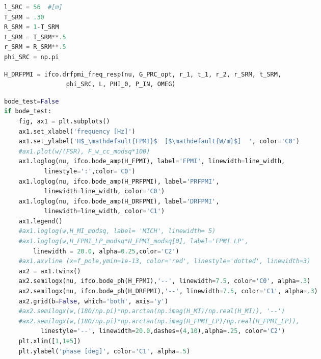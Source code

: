 \begin{spacing}{1.2}\begin{lstlisting}[frame=single, language=Python]
l_SRC = 56  #[m]
T_SRM = .30
R_SRM = 1-T_SRM
t_SRM = T_SRM**.5
r_SRM = R_SRM**.5
phi_SRC = np.pi
\end{lstlisting}\end{spacing}

\begin{spacing}{1.2}\begin{lstlisting}[frame=single, language=Python]
H_DRFPMI = ifco.drfpmi_freq_resp(nu, G_PRC_opt, r_1, t_1, r_2, r_SRM, t_SRM, 
				 phi_SRC, L, PHI_0, P_IN, OMEG)
\end{lstlisting}\end{spacing}

\begin{spacing}{1.2}\begin{lstlisting}[frame=single, language=Python]
bode_test=False
if bode_test:
    fig, ax1 = plt.subplots()
    ax1.set_xlabel('frequency [Hz]')
    ax1.set_ylabel('H$_\mathdefault{FPMI}$  [$\mathdefault{W/m}$]  ', color='C0')
    #ax1.plot(w/(FSR), F_w_cc_modsq*100)
    ax1.loglog(nu, ifco.bode_amp(H_FPMI), label='FPMI', linewidth=line_width, 
	       linestyle=':',color='C0')
    ax1.loglog(nu, ifco.bode_amp(H_PRFPMI), label='PRFPMI',  
	       linewidth=line_width, color='C0')
    ax1.loglog(nu, ifco.bode_amp(H_DRFPMI), label='DRFPMI',  
	       linewidth=line_width, color='C1')
    ax1.legend()
    #ax1.loglog(w,H_MI_modsq, label= 'MICH', linewidth= 5)
    #ax1.loglog(w,H_FPMI_LP_modsq*H_FPMI_modsq[0], label='FPMI LP', 
		linewidth = 20.0, alpha=0.25,color='C2')
    #ax1.axvline (x=f_pole,ymin=1e-13, color='red', linestyle='dotted', linewidth=3)
    ax2 = ax1.twinx()
    ax2.semilogx(nu, ifco.bode_ph(H_FPMI),'--', linewidth=7.5, color='C0', alpha=.3)
    ax2.semilogx(nu, ifco.bode_ph(H_DRFPMI),'--', linewidth=7.5, color='C1', alpha=.3)
    ax2.grid(b=False, which='both', axis='y')
    #ax2.semilogx(w,(180/np.pi)*np.arctan(np.imag(H_MI)/np.real(H_MI)), '--')
    #ax2.semilogx(w,(180/np.pi)*np.arctan(np.imag(H_FPMI_LP)/np.real(H_FPMI_LP)),
		  linestyle='--', linewidth=20.0,dashes=(4,10),alpha=.25, color='C2')
    plt.xlim([1,1e5])
    plt.ylabel('phase [deg]', color='C1', alpha=.5)
\end{lstlisting}\end{spacing}

